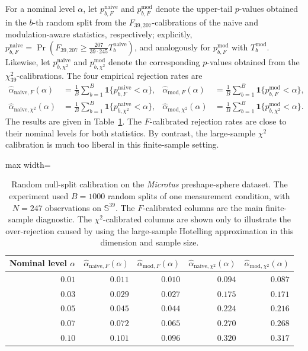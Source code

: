 \documentclass{amsart}
\theoremstyle{definition}
\theoremstyle{remark}
\newcommand\0{\boldsymbol{0}}
\begin{document}
For a nominal level \(\alpha\), let \(p^{\mathrm{naive}}_{b,F}\) and
\(p^{\mathrm{mod}}_{b,F}\) denote the upper-tail \(p\)-values obtained in the
\(b\)-th random split from the \(F_{39,207}\)-calibrations of the naive and
modulation-aware statistics, respectively; explicitly,
\(p^{\mathrm{naive}}_{b,F}
=\Pr\!\left(F_{39,207}\ge \frac{207}{39\cdot245}T_b^{\mathrm{naive}}\right)\),
and analogously for \(p^{\mathrm{mod}}_{b,F}\) with
\(T_b^{\mathrm{mod}}\).  Likewise, let
\(p^{\mathrm{naive}}_{b,\chi^2}\) and \(p^{\mathrm{mod}}_{b,\chi^2}\)
denote the corresponding \(p\)-values obtained from the
\(\chi^2_{39}\)-calibrations.  The four empirical rejection rates are
\[
\begin{aligned}
\widehat\alpha_{\mathrm{naive},F}(\alpha)
&=
\frac1B\sum_{b=1}^B
\mathbf 1\{p^{\mathrm{naive}}_{b,F}<\alpha\},
&
\widehat\alpha_{\mathrm{mod},F}(\alpha)
&=
\frac1B\sum_{b=1}^B
\mathbf 1\{p^{\mathrm{mod}}_{b,F}<\alpha\},\\
\widehat\alpha_{\mathrm{naive},\chi^2}(\alpha)
&=
\frac1B\sum_{b=1}^B
\mathbf 1\{p^{\mathrm{naive}}_{b,\chi^2}<\alpha\},
&
\widehat\alpha_{\mathrm{mod},\chi^2}(\alpha)
&=
\frac1B\sum_{b=1}^B
\mathbf 1\{p^{\mathrm{mod}}_{b,\chi^2}<\alpha\}.
\end{aligned}
\]
The results are given in
Table~\ref{tab:microtus-real-data-rejection}.  The \(F\)-calibrated rejection
rates are close to their nominal levels for both statistics.  By contrast, the
large-sample \(\chi^2\) calibration is much too liberal in this finite-sample
setting.

\begin{table}[H]
\centering
\caption{Random null-split calibration on the \textit{Microtus}
preshape-sphere dataset.  The experiment used \(B=1000\) random splits of
one measurement condition, with \(N=247\) observations on
\(\mathbb S^{39}\).  The \(F\)-calibrated columns are the main finite-sample
diagnostic.  The \(\chi^2\)-calibrated columns are shown only to illustrate
the over-rejection caused by using the large-sample Hotelling approximation
in this dimension and sample size.}
\label{tab:microtus-real-data-rejection}
\begin{adjustbox}{max width=\textwidth}
\begin{tabular}{rrrrr}
\toprule
Nominal level \(\alpha\)
& \(\widehat\alpha_{\mathrm{naive},F}(\alpha)\)
& \(\widehat\alpha_{\mathrm{mod},F}(\alpha)\)
& \(\widehat\alpha_{\mathrm{naive},\chi^2}(\alpha)\)
& \(\widehat\alpha_{\mathrm{mod},\chi^2}(\alpha)\) \\
\midrule
\(0.01\) & \(0.011\) & \(0.010\) & \(0.094\) & \(0.087\) \\
\(0.03\) & \(0.029\) & \(0.027\) & \(0.175\) & \(0.171\) \\
\(0.05\) & \(0.045\) & \(0.044\) & \(0.224\) & \(0.216\) \\
\(0.07\) & \(0.072\) & \(0.065\) & \(0.270\) & \(0.268\) \\
\(0.10\) & \(0.101\) & \(0.096\) & \(0.320\) & \(0.317\) \\
\bottomrule
\end{tabular}
\end{adjustbox}
\end{table}
\end{document}
